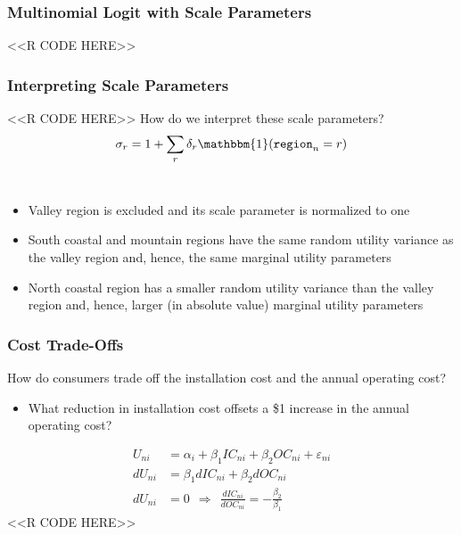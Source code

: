 \documentclass{beamer}
\begin{document}
\begin{frame}[fragile]\frametitle{Multinomial Logit with Scale Parameters}
    \vspace{0.5ex}
    <<R CODE HERE>>
\end{frame}

\begin{frame}[fragile]\frametitle{Interpreting Scale Parameters}
    <<R CODE HERE>>
    \vspace{2ex}
    How do we interpret these scale parameters?
    $$\sigma_r = 1 + \sum_{r} \delta_r \mathbbm{1}(\mathtt{region}_n = r)$$ \\
    \begin{itemize}
    	\item Valley region is excluded and its scale parameter is normalized to one
        \item South coastal and mountain regions have the same random utility variance as the valley region and, hence, the same marginal utility parameters
        \item North coastal region has a smaller random utility variance than the valley region and, hence, larger (in absolute value) marginal utility parameters
    \end{itemize}
\end{frame}

\begin{frame}[fragile]\frametitle{Cost Trade-Offs}
    How do consumers trade off the installation cost and the annual operating cost?
    \begin{itemize}
        \item What reduction in installation cost offsets a \$1 increase in the annual operating cost?
    \end{itemize}
    \begin{align*}
        U_{ni} & = \alpha_i + \beta_1 IC_{ni} + \beta_2 OC_{ni} + \varepsilon_{ni} \\
        dU_{ni} & = \beta_1 dIC_{ni} + \beta_2 dOC_{ni} \\
        dU_{ni} & = 0 ~~ \Rightarrow ~~ \frac{dIC_{ni}}{dOC_{ni}} = -\frac{\beta_2}{\beta_1}
    \end{align*}
    <<R CODE HERE>>
\end{frame}
\end{document}
